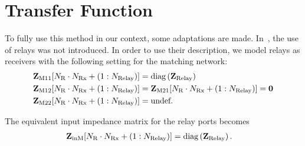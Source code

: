 \section{Transfer Function}
To fully use this method in our context, some adaptations are made.
In~\cite{Nossek}, the use of relays was not introduced.
In order to use their description, we model relays as receivers with the following setting for the matching network:	
\begin{align}
\label{eq:nossek_matching}
\mat{Z}_\text{M11}[N_\text{R}\cdot N_\text{Rx}+\left(1:N_\text{Relay}\right)] &=
	\text{diag}\left(\vec{Z}_\text{Relay}\right)\\
\mat{Z}_\text{M12}[N_\text{R}\cdot N_\text{Rx}+\left(1:N_\text{Relay}\right)] &= 
	\mat{Z}_\text{M21}[N_\text{R}\cdot N_\text{Rx}+\left(1:N_\text{Relay}\right)] = \mat{0}\\
\mat{Z}_\text{M22}[N_\text{R}\cdot N_\text{Rx}+\left(1:N_\text{Relay}\right)] &= \text{undef.}%
\end{align}

The equivalent input impedance matrix for the relay ports becomes
\begin{align}
\label{eq:nossek_matching}
\mathbf{Z}_\text{inM}[N_\text{R}\cdot N_\text{Rx}+\left(1:N_\text{Relay}\right)] &= \text{diag}\left(\mathbf{Z}_\text{Relay}\right).
\end{align}

